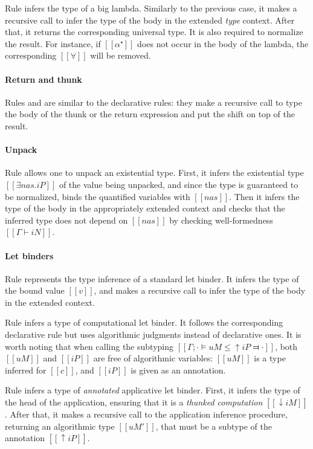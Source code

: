   Rule  infers the type of a big lambda.
  Similarly to the previous case, it makes a recursive call to infer the type
  of the body in the extended \emph{type} context. 
  After that, it returns the corresponding universal type. 
  It is also required to normalize the result.  
  For instance, if $[[α⁺]]$ does not occur in the body of the lambda,
  the corresponding $[[∀]]$ will be removed.

\paragraph*{Return and thunk}
  Rules  and 
  are similar to the declarative rules: they make a recursive call
  to type the body of the thunk or the return expression and
  put the shift on top of the result.

\paragraph*{Unpack}
  Rule 
  allows one to unpack an existential type.
  First, it infers the existential type $[[∃nas.iP]]$ of the value being unpacked,
  and since the type is guaranteed to be normalized, binds 
  the quantified variables with $[[nas]]$.
  Then it infers the type of the body in the appropriately extended context
  and checks that the inferred type does not depend on $[[nas]]$
  by checking well-formedness $[[Γ ⊢ iN]]$.

\paragraph*{Let binders}
  Rule  represents the type inference of a
  standard let binder. It infers the type of the bound value $[[v]]$, and makes
  a recursive call to infer the type of the body in the extended context.

  Rule  infers a type of computational let
  binder. It follows the corresponding declarative rule
   but uses algorithmic judgments instead of
  declarative ones. It is worth noting that when calling the subtyping 
  $[[Γ ; · ⊨ uM ≤ ↑iP ⫤ ·]]$, both $[[uM]]$ and $[[iP]]$ are free of algorithmic
  variables: $[[uM]]$ is a type inferred for $[[c]]$, and $[[iP]]$ is given as
  an annotation.

  Rule 
  infers a type of \emph{annotated} applicative let binder.
  First, it infers the type of the head of the application,
  ensuring that it is a \emph{thunked computation} $[[↓iM]]$.
  After that, it makes a recursive call
  to the application inference procedure,
  returning an algorithmic type $[[uM']]$, 
  that must be a subtype of the annotation $[[↑iP]]$.

